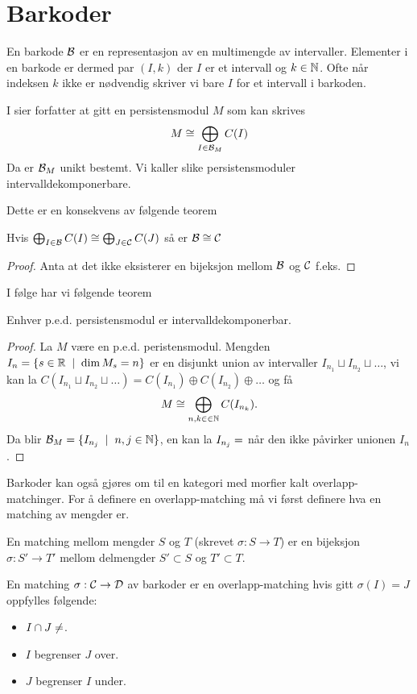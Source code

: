 \section{Barkoder}
En barkode $\mathcal{B}$ er en representasjon av en multimengde av intervaller. Elementer i en barkode er dermed par
$(I,k)$ der $I$ er et intervall og $k\in\mathbb{N}$. Ofte når indeksen $k$ ikke er nødvendig skriver vi bare $I$ for et intervall i barkoden.

I \cite{Bauer2015a} sier forfatter at gitt en persistensmodul $M$ som kan skrives
\[M\cong\bigoplus_{I\in\mathcal{B}_M}C(I)\]
Da er $\mathcal{B}_M$ unikt bestemt. Vi kaller slike persistensmoduler intervalldekomponerbare.

Dette er en konsekvens av følgende teorem

\begin{teorem}\label{Thrm:label}
    Hvis $\bigoplus_{I\in\mathcal{B}}C(I)\cong\bigoplus_{J\in\mathcal{C}} C(J)$ så er $\mathcal{B}\cong\mathcal{C}$
\end{teorem}
\begin{proof}
Anta at det ikke eksisterer en bijeksjon mellom $\mathcal{B}$ og $\mathcal{C}$ f.eks. 
\end{proof}

I følge \cite{Bauer2015a} har vi følgende teorem
\begin{teorem}\label{Thrm:thrm2.1}
	Enhver p.e.d. persistensmodul er intervalldekomponerbar.
\end{teorem}
\begin{proof}
	La $M$ være en p.e.d. peristensmodul. Mengden $I_n = \{s\in\mathbb{R}\;\mid\;\dim M_s=n\}$ er en disjunkt union av intervaller $I_{n_1}\sqcup I_{n_2}\sqcup\dots$, vi kan la $C(I_{n_1}\sqcup I_{n_2}\sqcup\dots)=C(I_{n_1})\oplus C(I_{n_2})\oplus\dots$ og få
	\[M\cong \bigoplus_{n,k\in\in\mathbb{N}} C(I_{n_k}).\]
	Da blir $\mathcal{B}_M = \{I_{n_j}\;\mid\; n,j\in\mathbb{N}\}$, en kan la $I_{n_j}=\es$ når den ikke påvirker unionen $I_n$. 
\end{proof}

Barkoder kan også gjøres om til en kategori med morfier kalt overlapp-matchinger. For å definere en
overlapp-matching må vi først definere hva en matching av mengder er.

\begin{definisjon}\label{def:Matching}
  En matching mellom mengder $S$ og $T$ (skrevet $\sigma:S\to T$) er en bijeksjon $\sigma: S'\to T'$ mellom delmengder $S'\subset S$ og $T'\subset T$.
\end{definisjon}

\begin{definisjon}\label{def:OverlappMch}
  En matching $\sigma: \mathcal{C}\to \mathcal{D}$ av barkoder er en overlapp-matching hvis gitt $\sigma(I)=J$ oppfylles
  følgende:
  \begin{itemize}
    \item $I\cap J \neq \es$.
    \item $I$ begrenser $J$ over.
    \item $J$ begrenser $I$ under.
  \end{itemize}
\end{definisjon}
